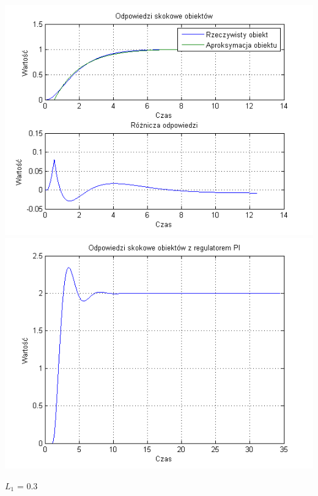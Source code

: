 \documentclass[10pt,a4paper]{article}
\begin{document}
\begin{center}
\includegraphics[scale=1]{images/jeden/skrypt_159.png}\\
\includegraphics[scale=1]{images/jeden/skrypt_160.png}\\
\end{center}
\newpage
$L_1$ = 0.3
\end{document}
